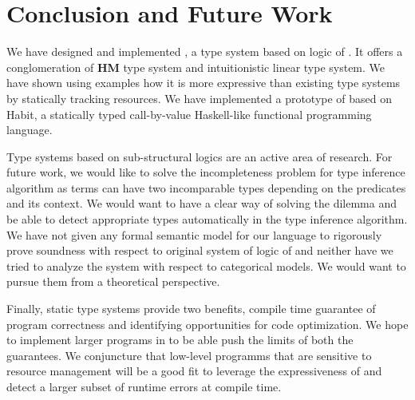 \chapter{Conclusion and Future Work}\label{chp:conclusion}

We have designed and implemented \qub{}, a type system based on logic of \BI{}.
It offers a conglomeration of \textbf{HM} type system and intuitionistic linear type system. We have shown
using examples how it is more expressive than existing type systems by statically tracking resources.
We have implemented a prototype of \qub{}\citep{apoorv_qub_2018} based on Habit\citep{diatchki_thesis_2007,morris_thesis_2013},
a statically typed call-by-value Haskell-like functional programming language.

Type systems based on sub-structural logics are an active area of research. For future work,
we would like to solve the incompleteness problem for \qub{} type inference algorithm as terms can have two incomparable types depending
on the predicates and its context. We would want to have a clear way of solving
the dilemma and be able to detect appropriate types automatically in the type inference algorithm.
We have not given any formal semantic model for our language to rigorously prove soundness with respect to original
system of logic of \BI{} and neither have we tried to analyze the system with respect to categorical models.
We would want to pursue them from a theoretical perspective.

Finally, static type systems provide two benefits, compile time guarantee of program correctness and identifying opportunities
for code optimization. We hope to implement larger programs in \qub{} to be able push the limits of both the guarantees.
We conjuncture that low-level programms that are sensitive to resource management will be a good fit to leverage the expressiveness of \qub{}
and detect a larger subset of runtime errors at compile time.
